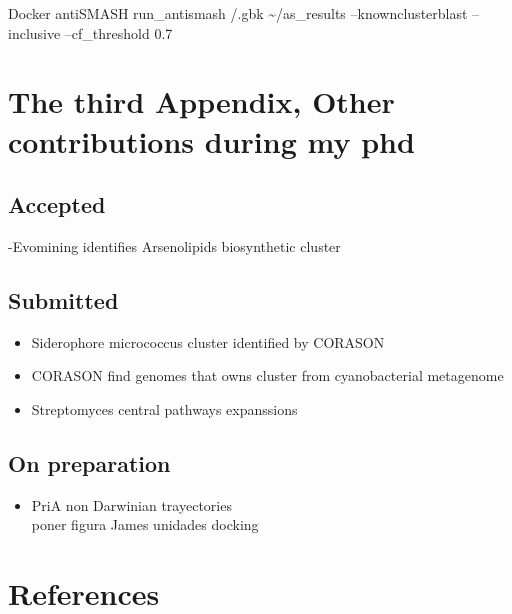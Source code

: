 \documentclass[12pt,twoside]{reedthesis}
\providecommand{\tightlist}{%
  \setlength{\itemsep}{0pt}\setlength{\parskip}{0pt}}
\begin{document}
  Docker antiSMASH run\_antismash /.gbk \textasciitilde{}/as\_results
  --knownclusterblast --inclusive --cf\_threshold 0.7
  
  \chapter{The third Appendix, Other contributions during my
  phd}\label{the-third-appendix-other-contributions-during-my-phd}
  
  \section{Accepted}\label{accepted}
  
  -Evomining identifies Arsenolipids biosynthetic cluster
  
  \section{Submitted}\label{submitted}
  
  \begin{itemize}
  \tightlist
  \item
    Siderophore micrococcus cluster identified by CORASON\\
  \item
    CORASON find genomes that owns cluster from cyanobacterial
    metagenome\\
  \item
    Streptomyces central pathways expanssions
  \end{itemize}
  
  \section{On preparation}\label{on-preparation}
  
  \begin{itemize}
  \tightlist
  \item
    PriA non Darwinian trayectories\\
    poner figura James unidades docking
  \end{itemize}
  
  \backmatter
  
  \chapter{References}\label{references}
  
  \noindent
  
\end{document}
